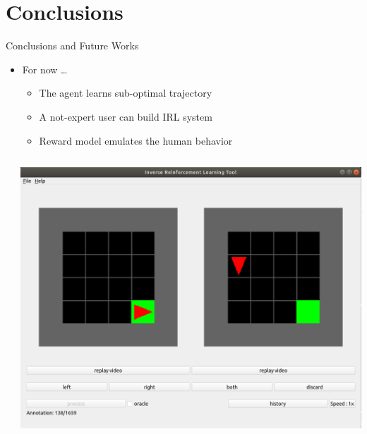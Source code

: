 \section{Conclusions}

\begin{frame}{Conclusions and Future Works}
	\begin{itemize}
		\item For now \ldots
		\begin{itemize}
			\item The agent learns sub-optimal trajectory 
			\item A not-expert user can build IRL system
			\item Reward model emulates the human behavior
		\end{itemize}
	\end{itemize}
	
	\begin{columns}
		
		\begin{column}{0.33\textwidth}
		\end{column}
		
		\begin{column}{0.33\textwidth}
			\includegraphics[width=0.8\linewidth]{images/alg_view.png}
		\end{column}
	

\end{columns}
\end{frame}
